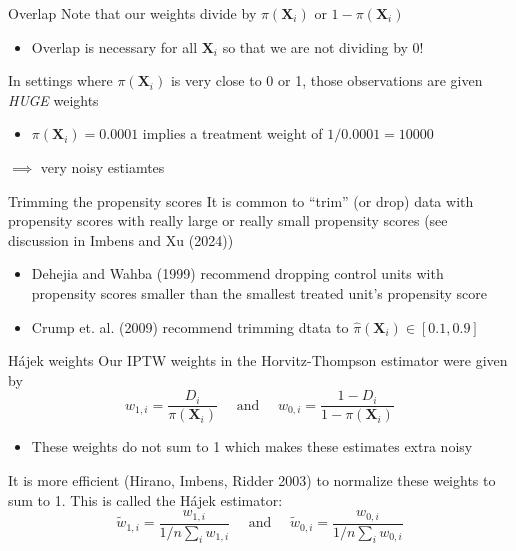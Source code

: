 \documentclass[aspectratio=169,t,11pt,table]{beamer}
\begin{document}
\begin{frame}{Overlap}
  Note that our weights divide by $\pi(\bm{X}_i)$ or $1 - \pi(\bm{X}_i)$
  \begin{itemize}
    \item Overlap is necessary for all $\bm{X}_i$ so that we are not dividing by 0!
  \end{itemize}

  \pause
  \bigskip
  In settings where $\pi(\bm{X}_i)$ is very close to 0 or 1, those observations are given \emph{HUGE} weights
  \begin{itemize}
    \item $\pi(\bm{X}_i) = 0.0001$ implies a treatment weight of $1 / 0.0001 = 10000$
  \end{itemize}
  \pause
  $\implies$ very noisy estiamtes
\end{frame}

\begin{frame}{Trimming the propensity scores}
  It is common to ``trim'' (or drop) data with propensity scores with really large or really small propensity scores (see discussion in Imbens and Xu (2024))
  \begin{itemize}
    \item Dehejia and Wahba (1999) recommend dropping control units with propensity scores smaller than the smallest treated unit's propensity score
    
    \item Crump et. al. (2009) recommend trimming dtata to $\hat{\pi}(\bm{X}_i) \in [0.1, 0.9]$ 
  \end{itemize}
\end{frame}

\begin{frame}{Hájek weights}
  Our IPTW weights in the Horvitz-Thompson estimator were given by 
  $$
    w_{1,i} = \frac{D_i}{\pi(\bm{X}_i)} \quad \text{ and } \quad w_{0,i} = \frac{1 - D_i}{1 - \pi(\bm{X}_i)}
  $$
  \begin{itemize}
    \item These weights do not sum to 1 which makes these estimates extra noisy
  \end{itemize}

  \bigskip
  \pause
  It is more efficient (Hirano, Imbens, Ridder 2003) to normalize these weights to sum to 1. This is called the Hájek estimator:
  $$
    \tilde{w}_{1,i} = \frac{w_{1,i}}{1/n \sum_i w_{1,i}} \quad \text{ and } \quad \tilde{w}_{0,i} = \frac{w_{0,i}}{1/n \sum_i w_{0,i}} 
  $$
\end{frame}
\end{document}
